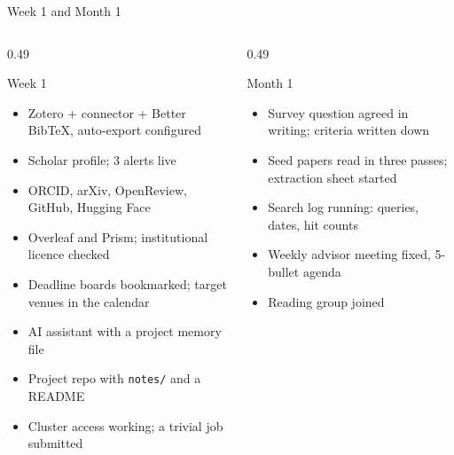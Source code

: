 \documentclass[aspectratio=169,11pt]{beamer}
\newcommand{\code}[1]{\texttt{\small #1}}
\begin{document}
\begin{frame}{Week 1 and Month 1}
\begin{columns}[T]
\begin{column}{0.49\textwidth}
\begin{block}{Week 1}
\footnotesize
\begin{itemize}
  \item Zotero + connector + Better BibTeX, auto-export configured
  \item Scholar profile; 3 alerts live
  \item ORCID, arXiv, OpenReview, GitHub, Hugging Face
  \item Overleaf and Prism; institutional licence checked
  \item Deadline boards bookmarked; target venues in the calendar
  \item AI assistant with a project memory file
  \item Project repo with \code{notes/} and a README
  \item Cluster access working; a trivial job submitted
\end{itemize}
\end{block}
\end{column}
\begin{column}{0.49\textwidth}
\begin{block}{Month 1}
\footnotesize
\begin{itemize}
  \item Survey question agreed in writing; criteria written down
  \item Seed papers read in three passes; extraction sheet started
  \item Search log running: queries, dates, hit counts
  \item Weekly advisor meeting fixed, 5-bullet agenda
  \item Reading group joined
\end{itemize}
\end{block}
\end{column}
\end{columns}
\end{frame}
\end{document}
